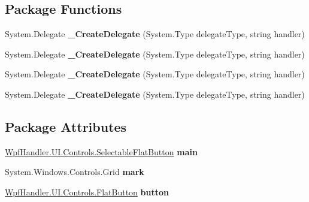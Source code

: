 \subsection*{Package Functions}
\begin{DoxyCompactItemize}
\item 
\mbox{\label{class_wpf_handler_1_1_u_i_1_1_controls_1_1_selectable_flat_button_a1db2b3726e01cd4d817fa10b67863427}} 
System.\+Delegate {\bfseries \+\_\+\+Create\+Delegate} (System.\+Type delegate\+Type, string handler)
\item 
\mbox{\label{class_wpf_handler_1_1_u_i_1_1_controls_1_1_selectable_flat_button_a1db2b3726e01cd4d817fa10b67863427}} 
System.\+Delegate {\bfseries \+\_\+\+Create\+Delegate} (System.\+Type delegate\+Type, string handler)
\item 
\mbox{\label{class_wpf_handler_1_1_u_i_1_1_controls_1_1_selectable_flat_button_a1db2b3726e01cd4d817fa10b67863427}} 
System.\+Delegate {\bfseries \+\_\+\+Create\+Delegate} (System.\+Type delegate\+Type, string handler)
\item 
\mbox{\label{class_wpf_handler_1_1_u_i_1_1_controls_1_1_selectable_flat_button_a1db2b3726e01cd4d817fa10b67863427}} 
System.\+Delegate {\bfseries \+\_\+\+Create\+Delegate} (System.\+Type delegate\+Type, string handler)
\end{DoxyCompactItemize}
\subsection*{Package Attributes}
\begin{DoxyCompactItemize}
\item 
\mbox{\label{class_wpf_handler_1_1_u_i_1_1_controls_1_1_selectable_flat_button_a3ad625ba0ad33ba34ce8f32b723f0bd9}} 
\mbox{\hyperlink{class_wpf_handler_1_1_u_i_1_1_controls_1_1_selectable_flat_button}{Wpf\+Handler.\+U\+I.\+Controls.\+Selectable\+Flat\+Button}} {\bfseries main}
\item 
\mbox{\label{class_wpf_handler_1_1_u_i_1_1_controls_1_1_selectable_flat_button_a6dca782fe163e0fd97183aa28bbbfb33}} 
System.\+Windows.\+Controls.\+Grid {\bfseries mark}
\item 
\mbox{\label{class_wpf_handler_1_1_u_i_1_1_controls_1_1_selectable_flat_button_a212d3f87419d2163a2c53afb72622991}} 
\mbox{\hyperlink{class_wpf_handler_1_1_u_i_1_1_controls_1_1_flat_button}{Wpf\+Handler.\+U\+I.\+Controls.\+Flat\+Button}} {\bfseries button}
\end{DoxyCompactItemize}
